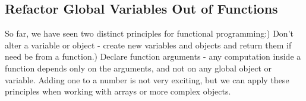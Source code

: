 \documentclass{article}%
\begin{document}
%
\subsection{Refactor Global Variables Out of Functions}%
\label{subsec:RefactorGlobalVariablesOutofFunctions}%
So far, we have seen two distinct principles for functional programming:) Don't alter a variable or object {-} create new variables and objects and return them if need be from a function.) Declare function arguments {-} any computation inside a function depends only on the arguments, and not on any global object or variable.\newline%
Adding one to a number is not very exciting, but we can apply these principles when working with arrays or more complex objects.\newline%

%
\end{document}
